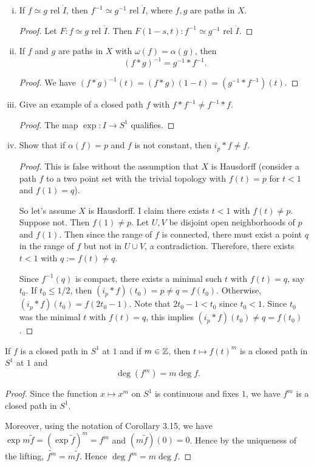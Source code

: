 \documentclass{article}
\begin{document}
 \begin{enumerate}[(i)]
\item If $f \simeq g$ rel $\dot I$, then $f^{-1} \simeq g^{-1}$ rel $\dot I$, where $f,g$ are paths in $X$.
\begin{proof}
Let $F:f \simeq g$ rel $\dot I$. Then $F(1-s, t):f^{-1} \simeq g^{-1}$ rel $\dot I$.
\end{proof}
\item If $f$ and $g$ are paths in $X$ with $\omega(f) = \alpha(g)$, then 
$$(f*g)^{-1} = g^{-1} * f^{-1}.$$
\begin{proof}
We have $(f*g)^{-1}(t) = (f*g)(1-t) = (g^{-1} * f^{-1})(t).$
\end{proof}

\item Give an example of a closed path $f$ with $f * f^{-1} \neq f^{-1} * f$.
\begin{proof}
The map $\exp:I \to S^1$ qualifies.
\end{proof}

\item Show that if $\alpha(f) = p$ and $f$ is not constant, then $i_p * f \neq f$.
\begin{proof}
This is false without the assumption that $X$ is Hausdorff (consider a path $f$ 
to a two point set with the trivial topology with $f(t) = p$ for $t < 1$
and $f(1) = q$).

So let's assume $X$ is Hausdorff. I claim there exists $t < 1$ with $f(t) \neq p$.  Suppose not. Then $f(1) \neq p$.
Let $U,V$ be disjoint open neighborhoods of $p$ and $f(1)$. Then since the range of $f$ is connected, there must exist 
a point $q$ in the range of $f$ but not in $U \cup V$, a contradiction. Therefore, there exists $t < 1$ with $q:= f(t) \neq q$. 

Since $f^{-1}(q)$ is compact, there exists a minimal such $t$ with $f(t) = q$, say $t_0$.  
If $t_0 \le 1/2$, then $(i_p * f)(t_0) = p \neq q = f(t_0)$.
Otherwise, $(i_p * f)(t_0) = f(2t_0 - 1)$.  Note that $2 t_0 -1 < t_0$ since $t_0 < 1$.  Since
$t_0$ was the minimal $t$ with $f(t) = q$, this implies $(i_p * f)(t_0) \neq q = f(t_0)$.
\end{proof}
\end{enumerate}


 If $f$ is a closed path in $S^1$ at $1$ and if $m \in \mathbb{Z}$, then $t \mapsto f(t)^m$ is a closed path in 
$S^1$ at $1$ and 
$$\deg(f^m) = m \deg f.$$
\begin{proof}
Since the function $x \mapsto x^m$ on $S^1$ is continuous and fixes $1$, we have $f^m$ is a closed path in $S^1$.

Moreover, using the notation of Corollary 3.15, we have $\exp m \tilde f = (\exp \tilde f)^m = f^m$ and $(m \tilde f)(0) = 0$.
Hence by the uniqueness of the lifting, $\widetilde{f^m} = m \tilde f$.  Hence $\deg f^m = m \deg f$.
\end{proof}
\end{document}
